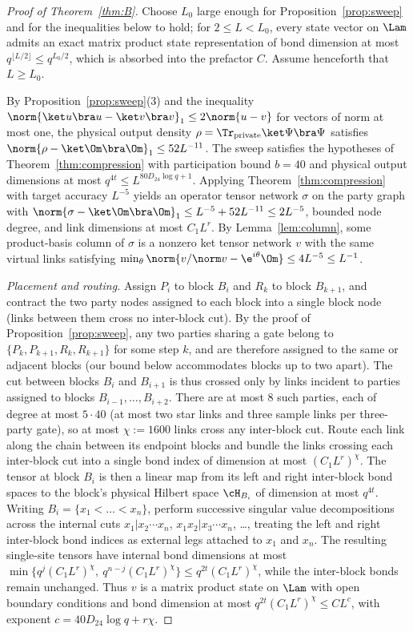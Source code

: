 \precisely
\begin{proof}[Proof of Theorem~\ref{thm:B}]
Choose $L_0$ large enough for Proposition~\ref{prop:sweep} and for the
inequalities below to hold; for $2\le L<L_0$, every state vector on $\Lam$ admits an exact
matrix product state representation of bond dimension at most $q^{\lfloor L/2\rfloor}\le
q^{L_0/2}$, which is absorbed into the prefactor $C$. Assume henceforth that $L\ge L_0$.

By Proposition~\ref{prop:sweep}(3) and the inequality
$\norm{\ket u\bra u-\ket v\bra v}_1\le2\norm{u-v}$ for vectors of norm at
most one, the physical output density
$\rho=\Tr_{\mathrm{private}}\ket\Psi\bra\Psi$ satisfies
$\norm{\rho-\ket\Om\bra\Om}_1\le 52L^{-11}$. The sweep satisfies the
hypotheses of Theorem~\ref{thm:compression} with participation bound $b=40$ and physical
output dimensions at most $q^{4t}\le L^{80D_{24}\log q+1}$. Applying Theorem~\ref{thm:compression} with target
accuracy $L^{-5}$ yields an operator tensor network $\sigma$ on the party
graph with $\norm{\sigma-\ket\Om\bra\Om}_1\le L^{-5}+52L^{-11}\le2L^{-5}$,
bounded node degree, and link dimensions at most $C_1L^{r}$. By
Lemma~\ref{lem:column}, some product-basis column of $\sigma$ is a nonzero ket tensor network $v$ with the
same virtual links satisfying $\min_\theta\norm{v/\norm v-\e^{i\theta}\Om}\le4L^{-5}\le L^{-1}$.

\emph{Placement and routing.} Assign $P_i$ to block $B_i$ and $R_k$ to block $B_{k+1}$, and
contract the two party nodes assigned to each block into a single block node (links between them
cross no inter-block cut). By the proof of
Proposition~\ref{prop:sweep}, any two parties sharing a gate belong to
$\{P_k,P_{k+1},R_k,R_{k+1}\}$ for some step $k$, and are therefore assigned to the same
or adjacent blocks (our bound below accommodates blocks up to two apart). The cut between blocks $B_i$ and $B_{i+1}$ is thus
crossed only by links incident to parties assigned to blocks
$B_{i-1},\dots,B_{i+2}$. There are at most $8$ such parties, each of degree at most
$5\cdot40$ (at most two star links and three sample links per three-party
gate), so at most $\chi:=1600$ links cross any inter-block cut. Route each link along the chain
between its endpoint blocks and bundle the links crossing each inter-block cut into a single
bond index of dimension at most $(C_1L^r)^{\chi}$. The tensor at block $B_i$ is
then a linear map from its left and right inter-block bond spaces to the block's
physical Hilbert space $\cH_{B_i}$ of dimension at most $q^{4t}$. Writing
$B_i=\{x_1<\dots<x_n\}$, perform successive singular value decompositions
across the internal cuts $x_1|x_2\cdots x_n$, $x_1x_2|x_3\cdots x_n$, \dots,
treating the left and right inter-block bond indices as external legs attached to
$x_1$ and $x_n$. The resulting single-site tensors have internal
bond dimensions at most $\min\{q^{j}(C_1L^r)^\chi,\ q^{n-j}(C_1L^r)^\chi\}\le
q^{2t}(C_1L^r)^{\chi}$, while the inter-block bonds remain unchanged. Thus $v$ is a
matrix product state on $\Lam$ with open boundary conditions and bond
dimension at most $q^{2t}(C_1L^r)^\chi\le CL^{c}$, with exponent
$c=40D_{24}\log q+r\chi$.
\end{proof}

